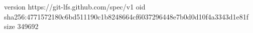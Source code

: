 version https://git-lfs.github.com/spec/v1
oid sha256:4771572180c6bd511190c1b8248664cf6037296448e7b0d0d10f4a3343d1e81f
size 349692

